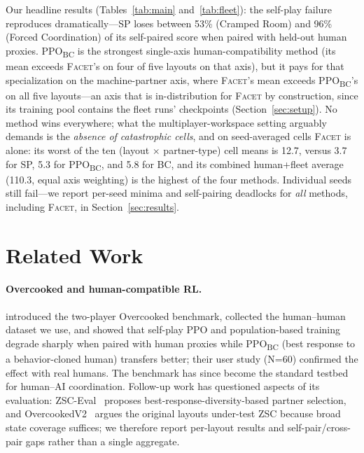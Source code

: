 \documentclass[11pt]{article}
\newcommand{\facet}{\textsc{Facet}}
\newcommand{\ppobc}{PPO\textsubscript{BC}}
\begin{document}
Our headline results (Tables~\ref{tab:main} and~\ref{tab:fleet}): the
self-play failure reproduces dramatically---SP loses between 53\%
(Cramped Room) and 96\% (Forced Coordination) of its self-paired score when
paired with held-out human proxies. \ppobc{} is the strongest single-axis
human-compatibility method (its mean exceeds \facet{}'s on four of five
layouts on that axis), but it pays for that specialization on the
machine-partner axis, where \facet{}'s mean exceeds \ppobc{}'s on all five
layouts---an axis that is in-distribution for \facet{} by construction,
since its training pool contains the fleet runs' checkpoints
(Section~\ref{sec:setup}). No method wins everywhere; what the
multiplayer-workspace setting arguably demands is the \emph{absence of
catastrophic cells}, and on seed-averaged cells \facet{} is alone: its
worst of the ten (layout $\times$ partner-type) cell means is 12.7,
versus 3.7 for SP, 5.3 for \ppobc{}, and 5.8 for BC, and its combined
human+fleet average (110.3, equal axis weighting) is the highest of the
four methods. Individual seeds still fail---we report per-seed minima and
self-pairing deadlocks for \emph{all} methods, including \facet{}, in
Section~\ref{sec:results}.

\section{Related Work}
\label{sec:related}

\paragraph{Overcooked and human-compatible RL.}
\citet{carroll2019utility} introduced the two-player Overcooked benchmark,
collected the human--human dataset we use, and showed that self-play PPO and
population-based training degrade sharply when paired with human proxies
while \ppobc{} (best response to a behavior-cloned human) transfers better;
their user study (N=60) confirmed the effect with real humans. The benchmark
has since become the standard testbed for human--AI coordination. Follow-up
work has questioned aspects of its evaluation: ZSC-Eval~\citep{wang2024zsceval}
proposes best-response-diversity-based partner selection, and
OvercookedV2~\citep{gessler2025overcookedv2} argues the original layouts
under-test ZSC because broad state coverage suffices; we therefore report
per-layout results and self-pair/cross-pair gaps rather than a single
aggregate.
\end{document}
